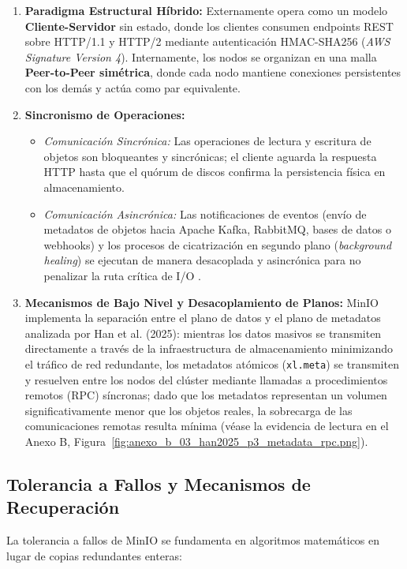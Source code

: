 \documentclass[12pt,a4paper]{article}
\begin{document}
\begin{enumerate}[leftmargin=*]
    \item \textbf{Paradigma Estructural Híbrido:} Externamente opera como un modelo \textbf{Cliente-Servidor} sin estado, donde los clientes consumen endpoints REST sobre HTTP/1.1 y HTTP/2 mediante autenticación HMAC-SHA256 (\emph{AWS Signature Version 4}). Internamente, los nodos se organizan en una malla \textbf{Peer-to-Peer simétrica}, donde cada nodo mantiene conexiones persistentes con los demás y actúa como par equivalente.
    \item \textbf{Sincronismo de Operaciones:} 
    \begin{itemize}
        \item \emph{Comunicación Sincrónica:} Las operaciones de lectura y escritura de objetos son bloqueantes y sincrónicas; el cliente aguarda la respuesta HTTP hasta que el quórum de discos confirma la persistencia física en almacenamiento.
        \item \emph{Comunicación Asincrónica:} Las notificaciones de eventos (envío de metadatos de objetos hacia Apache Kafka, RabbitMQ, bases de datos o webhooks) y los procesos de cicatrización en segundo plano (\emph{background healing}) se ejecutan de manera desacoplada y asincrónica para no penalizar la ruta crítica de I/O \cite{mehmood20255gminio}.
    \end{itemize}
    \item \textbf{Mecanismos de Bajo Nivel y Desacoplamiento de Planos:} MinIO implementa la separación entre el plano de datos y el plano de metadatos analizada por Han et al. (2025): mientras los datos masivos se transmiten directamente a través de la infraestructura de almacenamiento minimizando el tráfico de red redundante, los metadatos atómicos (\texttt{xl.meta}) se transmiten y resuelven entre los nodos del clúster mediante llamadas a procedimientos remotos (RPC) síncronas; dado que los metadatos representan un volumen significativamente menor que los objetos reales, la sobrecarga de las comunicaciones remotas resulta mínima \cite{han2025rdio} (véase la evidencia de lectura en el Anexo B, Figura~\ref{fig:anexo_b_03_han2025_p3_metadata_rpc.png}).
\end{enumerate}

\subsection{Tolerancia a Fallos y Mecanismos de Recuperación}
La tolerancia a fallos de MinIO se fundamenta en algoritmos matemáticos en lugar de copias redundantes enteras:
\end{document}
